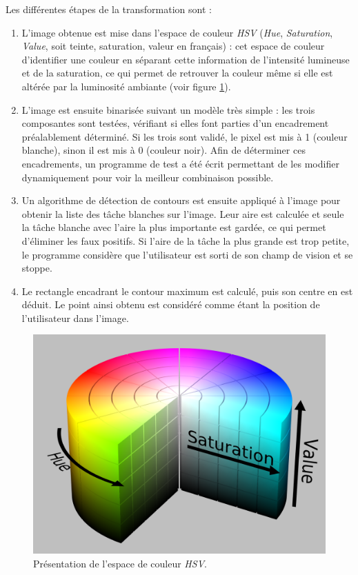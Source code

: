Les différentes étapes de la transformation sont : \begin{enumerate}
    \item L'image obtenue est mise dans l'espace de couleur \emph{HSV} (\emph{Hue}, \emph{Saturation}, \emph{Value}, soit teinte, saturation, valeur en français) : cet espace de couleur d'identifier une couleur en séparant cette information de l'intensité lumineuse et de la saturation, ce qui permet de retrouver la couleur même si elle est altérée par la luminosité ambiante (voir figure \ref{hsv}).
    \item L'image est ensuite binarisée suivant un modèle très simple : les trois composantes sont testées, vérifiant si elles font parties d'un encadrement préalablement déterminé. Si les trois sont validé, le pixel est mis à 1 (couleur blanche), sinon il est mis à 0 (couleur noir). Afin de déterminer ces encadrements, un programme de test a été écrit permettant de les modifier dynamiquement pour voir la meilleur combinaison possible. %
    \item Un algorithme de détection de contours est ensuite appliqué à l'image pour obtenir la liste des tâche blanches sur l'image. Leur aire est calculée et seule la tâche blanche avec l'aire la plus importante est gardée, ce qui permet d'éliminer les faux positifs. Si l'aire de la tâche la plus grande est trop petite, le programme considère que l'utilisateur est sorti de son champ de vision et se stoppe.
    \item Le rectangle encadrant le contour maximum est calculé, puis son centre en est déduit. Le point ainsi obtenu est considéré comme étant la position de l'utilisateur dans l'image.
\end{enumerate}

\begin{figure}
    \begin{center}
        \includegraphics[width=0.75\linewidth]{rcs/hsv.png}
    \end{center}
    \caption{Présentation de l'espace de couleur \emph{HSV}.}
    \label{hsv}
\end{figure}



